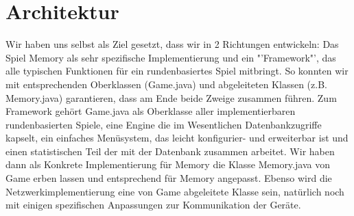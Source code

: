 \documentclass[11pt,a4paper]{article}
\begin{document}


\section {Architektur}
Wir haben uns selbst als Ziel gesetzt, dass wir in 2 Richtungen entwickeln: Das Spiel Memory als sehr spezifische Implementierung und ein "'Framework"', das alle typischen Funktionen für ein rundenbasiertes Spiel mitbringt. So konnten wir mit entsprechenden Oberklassen (Game.java) und abgeleiteten Klassen (z.B. Memory.java) garantieren, dass am Ende beide Zweige zusammen führen.
Zum Framework gehört Game.java als Oberklasse aller implementierbaren rundenbasierten Spiele, eine Engine die im Wesentlichen Datenbankzugriffe kapselt, ein einfaches Menüsystem, das leicht konfigurier- und erweiterbar ist und einen statistischen Teil der mit der Datenbank zusammen arbeitet. Wir haben dann als Konkrete Implementierung für Memory die Klasse Memory.java von Game erben lassen und entsprechend für Memory angepasst. Ebenso wird die Netzwerkimplementierung eine von Game abgeleitete Klasse sein, natürlich noch mit einigen spezifischen Anpassungen zur Kommunikation der Geräte.
\end{document}
